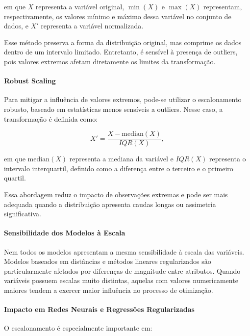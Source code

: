 \noindent em que \(X\) representa a variável original, \(\min(X)\) e \(\max(X)\) representam, respectivamente, os valores mínimo e máximo dessa variável no conjunto de dados, e \(X'\) representa a variável normalizada.

Esse método preserva a forma da distribuição original, mas comprime os dados dentro de um intervalo limitado. Entretanto, é sensível à presença de outliers, pois valores extremos afetam diretamente os limites da transformação.

\paragraph{Robust Scaling}

Para mitigar a influência de valores extremos, pode-se utilizar o escalonamento robusto, baseado em estatísticas menos sensíveis a outliers. Nesse caso, a transformação é definida como:

\begin{equation}
X' = \frac{X - \mathrm{median}(X)}{IQR(X)},
\label{eq:robust_scaling}
\end{equation}

\noindent em que \(\mathrm{median}(X)\) representa a mediana da variável e \(IQR(X)\) representa o intervalo interquartil, definido como a diferença entre o terceiro e o primeiro quartil.

Essa abordagem reduz o impacto de observações extremas e pode ser mais adequada quando a distribuição apresenta caudas longas ou assimetria significativa.

\paragraph{Sensibilidade dos Modelos à Escala}

Nem todos os modelos apresentam a mesma sensibilidade à escala das variáveis. Modelos baseados em distâncias e métodos lineares regularizados são particularmente afetados por diferenças de magnitude entre atributos. Quando variáveis possuem escalas muito distintas, aquelas com valores numericamente maiores tendem a exercer maior influência no processo de otimização.

\paragraph{Impacto em Redes Neurais e Regressões Regularizadas}

O escalonamento é especialmente importante em:

